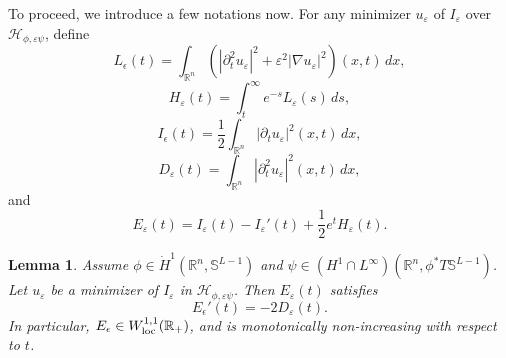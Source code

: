 \documentclass[12pt,twoside,reqno]{amsart}
\newtheorem{lemma}[theorem]{Lemma}
\theoremstyle{definition}              %
\theoremstyle{remark}                  %
\newcommand{\eps}{\varepsilon}
\renewcommand{\1}{\mathbbm{1}}                                      %
\numberwithin{equation}{section}
\numberwithin{definition}{section}
\numberwithin{theorem}{section}
\numberwithin{remark}{section}
\begin{document}
To proceed, we introduce a few notations now. 
For any minimizer $u_\eps$ of $I_\eps$ over $\mathcal{H}_{\phi,\eps\psi}$, define
$$
L_\epsilon(t)=\int_{\mathbb{R}^n}
(|\partial_t^2u_\eps|^2+\eps^2|\nabla u_\eps|^2)(x,t)\,dx,
$$
$$
H_\eps(t)=\int_t^\infty e^{-s}L_\eps(s)\,ds,
$$
$$
I_\epsilon(t)=\frac12 \int_{\mathbb{R}^n} |\partial_tu_\eps|^2(x,t)\,dx,
$$
$$
D_\eps(t)=\int_{\mathbb{R}^n} |\partial_t^2u_\eps|^2(x,t)\,dx,
$$
and
$$
E_\eps(t)=I_\eps(t)-I_\eps'(t) 
+\frac12 e^t H_\eps(t).
$$

\begin{lemma} \label{energyestimate}  Assume $\phi\in \dot{H}^1(\mathbb R^n,\mathbb S^{L-1})$ 
and $\psi\in ({H}^1\cap L^\infty)(\mathbb R^n,\mathbb \phi^*T\mathbb{S}^{L-1})$.
Let $u_\eps$ be a minimizer of $I_\eps$ in $\mathcal{H}_{\phi,\eps\psi}$. Then
$E_\eps(t)$ satisfies
\begin{equation}\label{energy_identity}
 E_\epsilon'(t)=-2D_\eps(t).    
\end{equation}
In particular, $E_\epsilon\in W^{1,1}_{\rm{loc}}(\mathbb{R}_+)$, and is monotonically non-increasing with respect to $t$.    
\end{lemma}
\end{document}
